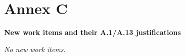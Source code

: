 
\clearpage
\section*{Annex C}\label{annex-c}



\begin{center}
\textbf{New work items and their A.1/A.13 justifications}
\end{center}

\ifx\wpAnnexNewWorkItems\undefined
\textit{No new work items.}
\else
\begin{itemize}
\wpAnnexNewWorkItems
\end{itemize}
\fi
